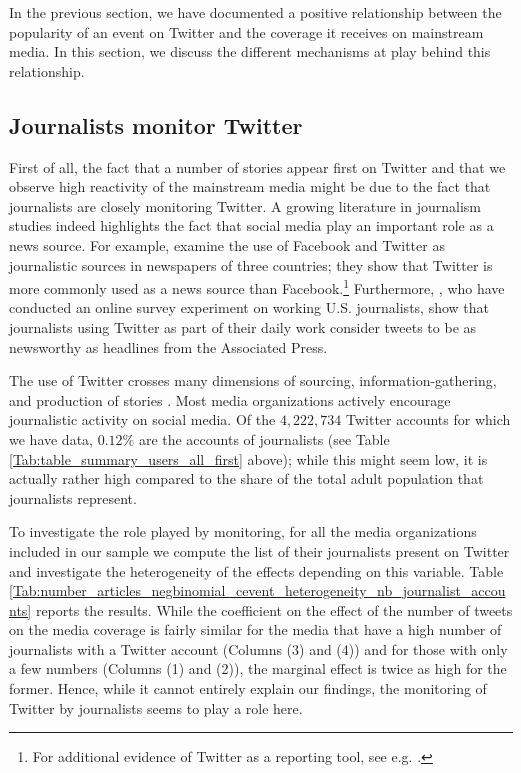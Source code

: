 In the previous section, we have documented a positive relationship between the popularity of an event on Twitter and the coverage it receives on mainstream media. In this section, we discuss the different mechanisms at play behind this relationship.

\subsection{Journalists monitor Twitter}

First of all, the fact that a number of stories appear first on Twitter and that we observe high reactivity of the mainstream media might be due to the fact that journalists are closely monitoring Twitter. A growing literature in journalism studies indeed highlights the fact that social media play an important role as a news source. For example, \citet{vonNordheimBoczekKoppers2018} examine the use of Facebook and Twitter as journalistic sources in newspapers of three countries; they show that Twitter is more commonly used as a news source than Facebook.\footnote{For additional evidence of Twitter as a reporting tool, see e.g. \citet{Vis2012}.} Furthermore, \citet{mcgregor_twitter_2018}, who have conducted an online survey experiment on working U.S. journalists, show that journalists using Twitter as part of their daily work consider tweets to be as newsworthy as headlines from the Associated Press.

The use of Twitter crosses many dimensions of sourcing, information-gathering, and production of stories \citep{Wihbeyetal2018}. Most media organizations actively encourage journalistic activity on social media. Of the $4,222,734$ Twitter accounts for which we have data, $0.12\%$ are the accounts of journalists (see Table \ref{Tab:table_summary_users_all_first} above); while this might seem low, it is actually rather high compared to the share of the total adult population that journalists represent.

To investigate the role played by monitoring, for all the media organizations included in our sample we compute the list of their journalists present on Twitter and investigate the heterogeneity of the effects depending on this variable. Table \ref{Tab:number_articles_negbinomial_cevent_heterogeneity_nb_journalist_accounts} reports the results. While the coefficient on the effect of the number of tweets on the media coverage is fairly similar for the media that have a high number of journalists with a Twitter account (Columns (3) and (4)) and for those with only a few numbers (Columns (1) and (2)), the marginal effect is twice as high for the former. Hence, while it cannot entirely explain our findings, the monitoring of Twitter by journalists seems to play a role here.


